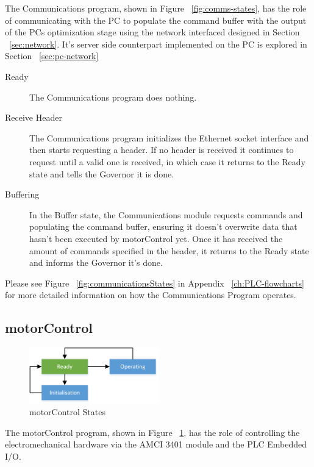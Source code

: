 	The Communications program, shown in Figure ~\ref{fig:comms-states}, has the role of communicating with the PC to populate the command buffer with the output of the PCs optimization stage using the network interfaced designed in Section ~\ref{sec:network}. It's server side counterpart implemented on the PC is explored in Section ~\ref{sec:pc-network}

	
			\begin{description}
				\item[Ready] The Communications program does nothing.
				\item[Receive Header] The Communications program initializes the Ethernet socket interface and then starts requesting a header. If no header is received it continues to request until a valid one is received, in which case it returns to the Ready state and tells the Governor it is done.
				\item[Buffering] In the Buffer state, the Communications module requests commands and populating the command buffer, ensuring it doesn't overwrite data that hasn't been executed by motorControl yet. Once it has received the amount of commands specified in the header, it returns to the Ready state and informs the Governor it's done.
			\end{description}
			
		Please see Figure ~\ref{fig:communicationsStates} in Appendix ~\ref{ch:PLC-flowcharts} for more detailed information on how the Communications Program operates.


\subsection{motorControl}

			\begin{figure}[h]
				\centering
				\includegraphics[width=0.5\textwidth]{figures/cncMachine/motorControl_simple.png}
				\caption{motorControl States}
				\label{fig:motorcontrol-states}
			\end{figure}
	
	The motorControl program, shown in Figure ~\ref{fig:motorcontrol-states}, has the role of controlling the electromechanical hardware via the AMCI 3401 module and the PLC Embedded I/O. 
	
